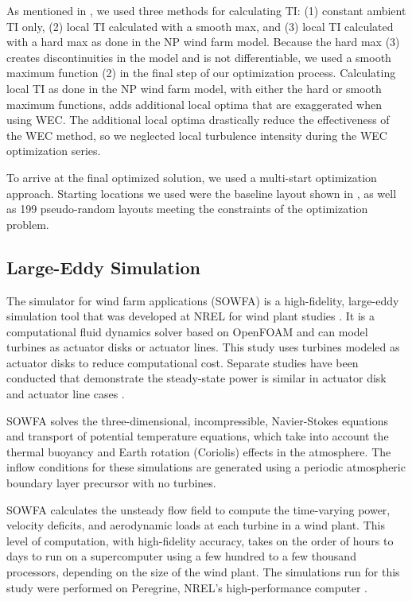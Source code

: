 \documentclass[conf]{new-aiaa}
\begin{document}
As mentioned in , we used three methods for calculating TI: (1) constant ambient TI only, (2) local TI calculated with a smooth max, and (3) local TI calculated with a hard max as done in the NP wind farm model. Because the hard max (3) creates discontinuities in the model and is not differentiable, we used a smooth maximum function (2) in the final step of our optimization process.  Calculating local TI as done in the NP wind farm model, with either the hard or smooth maximum functions, adds additional local optima that are exaggerated when using WEC. The additional local optima drastically reduce the effectiveness of the WEC method, so we neglected local turbulence intensity during the WEC optimization series. 

To arrive at the final optimized solution, we used a multi-start optimization approach. Starting locations we used were the baseline layout shown in , as well as 199 pseudo-random layouts meeting the constraints of the optimization problem.

\subsection{Large-Eddy Simulation}

The simulator for wind farm applications (SOWFA) is a high-fidelity, large-eddy simulation tool that was developed at NREL for wind plant studies \cite{churchfieldnwtc,churchfield2012numerical,fleming2013sowfa}.  It is a computational fluid dynamics solver based on OpenFOAM \cite{jasak2007openfoam} and can model turbines as actuator disks or actuator lines.  This study uses turbines modeled as actuator disks to reduce computational cost.  Separate studies have been conducted that demonstrate the steady-state power is similar in actuator disk and actuator line cases \cite{martinez2012comparison}.

SOWFA solves the three-dimensional, incompressible, Navier-Stokes equations and transport of potential temperature equations, which take into account the thermal buoyancy and Earth rotation (Coriolis) effects in the atmosphere.  The inflow conditions for these simulations are generated using a periodic atmospheric boundary layer precursor with no turbines.  

SOWFA calculates the unsteady flow field to compute the time-varying power, velocity deficits, and aerodynamic loads at each turbine in a wind plant.  This level of computation, with high-fidelity accuracy, takes on the order of hours to days to run on a supercomputer using a few hundred to a few thousand processors, depending on the size of the wind plant. The simulations run for this study were performed on Peregrine, NREL's high-performance computer \cite{regimbal2015peregrine}.
\end{document}
